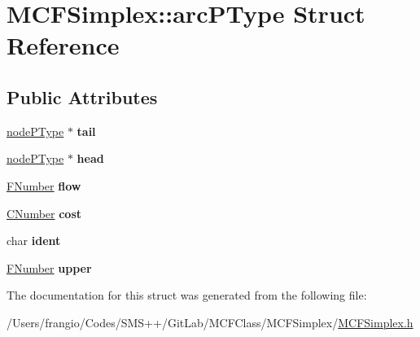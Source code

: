\hypertarget{struct_m_c_f_simplex_1_1arc_p_type}{}\section{M\+C\+F\+Simplex\+:\+:arc\+P\+Type Struct Reference}
\label{struct_m_c_f_simplex_1_1arc_p_type}
\subsection*{Public Attributes}
\begin{DoxyCompactItemize}
\item 
\mbox{\label{struct_m_c_f_simplex_1_1arc_p_type_a5321961490dc36e3c9a0c671008118c9}} 
\mbox{\hyperlink{struct_m_c_f_simplex_1_1node_p_type}{node\+P\+Type}} $\ast$ {\bfseries tail}
\item 
\mbox{\label{struct_m_c_f_simplex_1_1arc_p_type_a7b38b24a31e49f54a2d94f04d5997953}} 
\mbox{\hyperlink{struct_m_c_f_simplex_1_1node_p_type}{node\+P\+Type}} $\ast$ {\bfseries head}
\item 
\mbox{\label{struct_m_c_f_simplex_1_1arc_p_type_ad3a232f7afd015905a9023b2e3f2180b}} 
\mbox{\hyperlink{class_m_c_f_class_aeea3e5951d222b2a8e57de1b4246a909}{F\+Number}} {\bfseries flow}
\item 
\mbox{\label{struct_m_c_f_simplex_1_1arc_p_type_a77314dc0447f6b3c87d85436b242aa4b}} 
\mbox{\hyperlink{class_m_c_f_class_a24d0627ba8213afe1ec4ebeb4508e8f1}{C\+Number}} {\bfseries cost}
\item 
\mbox{\label{struct_m_c_f_simplex_1_1arc_p_type_aad21f39e6140cc7d4402bcb9295c67d8}} 
char {\bfseries ident}
\item 
\mbox{\label{struct_m_c_f_simplex_1_1arc_p_type_a226bb8b0131b2d6e7c1f9cf000b2fa22}} 
\mbox{\hyperlink{class_m_c_f_class_aeea3e5951d222b2a8e57de1b4246a909}{F\+Number}} {\bfseries upper}
\end{DoxyCompactItemize}


The documentation for this struct was generated from the following file\+:\begin{DoxyCompactItemize}
\item 
/\+Users/frangio/\+Codes/\+S\+M\+S++/\+Git\+Lab/\+M\+C\+F\+Class/\+M\+C\+F\+Simplex/\mbox{\hyperlink{_m_c_f_simplex_8h}{M\+C\+F\+Simplex.\+h}}\end{DoxyCompactItemize}
